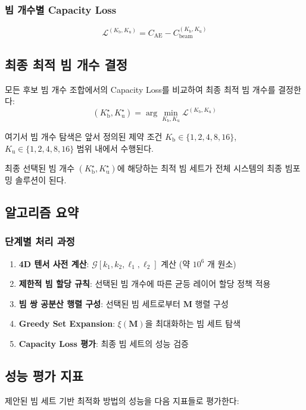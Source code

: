 \documentclass[10pt]{article}
\begin{document}
\subsubsection{빔 개수별 Capacity Loss}
\begin{equation}
\mathcal{L}^{(K_{\text{b}}, K_{\text{u}})} = C_{\text{AE}} - C_{\text{beam}}^{(K_{\text{b}}, K_{\text{u}})}
\end{equation}

\subsection{최종 최적 빔 개수 결정}
모든 후보 빔 개수 조합에서의 Capacity Loss를 비교하여 최종 최적 빔 개수를 결정한다:
\begin{equation}
(K_{\text{b}}^{\star}, K_{\text{u}}^{\star}) = \arg\min_{K_{\text{b}}, K_{\text{u}}} \mathcal{L}^{(K_{\text{b}}, K_{\text{u}})}
\end{equation}

여기서 빔 개수 탐색은 앞서 정의된 제약 조건 $K_{\text{b}} \in \{1, 2, 4, 8, 16\}$, $K_{\text{u}} \in \{1, 2, 4, 8, 16\}$ 범위 내에서 수행된다.

최종 선택된 빔 개수 $(K_{\text{b}}^{\star}, K_{\text{u}}^{\star})$에 해당하는 최적 빔 세트가 전체 시스템의 최종 빔포밍 솔루션이 된다.

\subsection{알고리즘 요약}
\subsubsection{단계별 처리 과정}
\begin{enumerate}
\item \textbf{4D 텐서 사전 계산}: $\mathcal{G}[k_1, k_2, \ell_1, \ell_2]$ 계산 (약 $10^6$ 개 원소)
\item \textbf{제한적 빔 할당 규칙}: 선택된 빔 개수에 따른 균등 레이어 할당 정책 적용
\item \textbf{빔 쌍 공분산 행렬 구성}: 선택된 빔 세트로부터 $\mathbf{M}$ 행렬 구성
\item \textbf{Greedy Set Expansion}: $\xi(\mathbf{M})$을 최대화하는 빔 세트 탐색
\item \textbf{Capacity Loss 평가}: 최종 빔 세트의 성능 검증
\end{enumerate}

\subsection{성능 평가 지표}
제안된 빔 세트 기반 최적화 방법의 성능을 다음 지표들로 평가한다:
\end{document}
